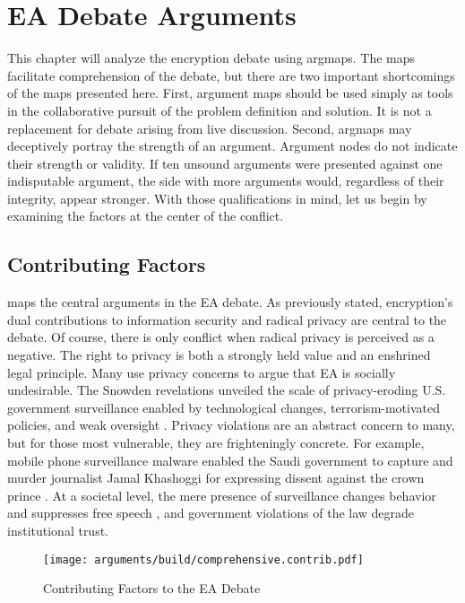 \chapter{EA Debate Arguments}
\label{chap-arguments}

This chapter will analyze the \ac{encryption} debate using \acp{argmap}. The maps facilitate comprehension of the
debate, but there are two important shortcomings of the maps presented here. First, argument maps should be used simply
as tools in the collaborative pursuit of the problem definition and solution. It is not a replacement for debate arising
from live discussion. Second, \acp{argmap} may deceptively portray the strength of an argument. Argument nodes do not
indicate their strength or validity. If ten unsound arguments were presented against one indisputable argument, the side
with more arguments would, regardless of their integrity, appear stronger. With those qualifications in mind, let us
begin by examining the factors at the center of the conflict.


\section{Contributing Factors}
\label{sed-arg-contrib}

 maps the central arguments in the EA debate. As previously stated, \ac{encryption}'s dual
contributions to information security and radical privacy are central to the debate. Of course, there is only conflict
when radical privacy is perceived as a negative. The right to privacy is both a strongly held value and an enshrined
legal principle. Many use privacy concerns to argue that \ac{EA} is socially undesirable. The Snowden revelations
\cite{landau_making_2013} unveiled the scale of privacy-eroding U.S. government surveillance enabled by technological
changes, terrorism-motivated policies, and weak oversight \cite{shamsi_2011}. Privacy violations are an abstract concern
to many, but for those most vulnerable, they are frighteningly concrete. For example, mobile phone surveillance malware
enabled the Saudi government to capture and murder journalist Jamal Khashoggi for expressing dissent against the crown
prince \cite{liebermann_2019}. At a societal level, the mere presence of surveillance changes behavior and suppresses
free speech \cite{rogaway_moral_2015}, and government violations of the law degrade institutional trust.

\begin{sidewaysfigure}
  \centering\CaptionFontSize
  \texttt{[image: arguments/build/comprehensive.contrib.pdf]}
  \caption{Contributing Factors to the EA Debate}
  \label{fig-args-contrib}
\end{sidewaysfigure}

